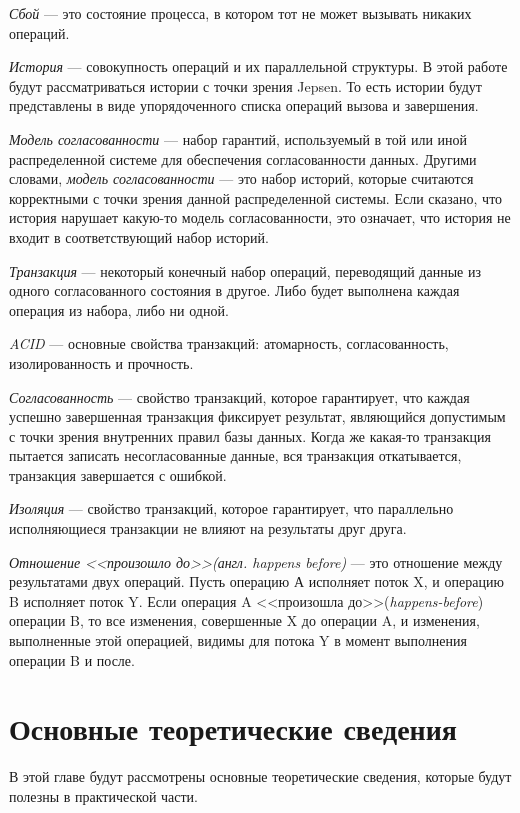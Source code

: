 \documentclass[12pt,  openany]{book}
\begin{document}
\emph{Сбой} --- это состояние процесса, в котором тот не может вызывать никаких операций. 

\emph{История} --- совокупность операций и их параллельной структуры. В этой работе будут рассматриваться истории с точки зрения Jepsen. То есть истории будут представлены в виде упорядоченного списка операций вызова и завершения.

\emph{Модель согласованности} --- набор гарантий, используемый в той или иной распределенной системе для обеспечения согласованности данных.  Другими словами,  \textit{модель согласованности} --- это набор историй, которые считаются корректными с точки зрения данной распределенной системы.  Если сказано, что история нарушает какую-то модель согласованности, это означает, что история не входит в соответствующий набор историй. \cite{jepsenConsistencyModels}

\emph{Транзакция} --- некоторый конечный набор операций, переводящий данные из одного согласованного состояния в другое. Либо будет выполнена каждая операция из набора, либо ни одной.

\emph{ACID} --- основные свойства транзакций: атомарность, согласованность, изолированность и прочность.

\emph{Согласованность} --- свойство транзакций, которое гарантирует, что каждая успешно завершенная транзакция фиксирует результат, являющийся допустимым с точки зрения внутренних правил базы данных. Когда же какая-то транзакция пытается записать несогласованные данные, вся транзакция откатывается, транзакция завершается с ошибкой.

\emph{Изоляция} --- свойство транзакций, которое гарантирует, что параллельно исполняющиеся транзакции не влияют на результаты друг друга. 

\emph{Отношение <<произошло до>>(англ. \textit{happens before})} --- \cite{habrMemoryModel} это отношение между результатами двух операций.  Пусть операцию А исполняет поток X, и операцию B исполняет поток Y. Если операция A <<произошла до>>(\textit{happens-before}) операции B, то все изменения, совершенные X до операции A, и изменения, выполненные этой операцией, видимы для потока Y в момент выполнения операции B и после.  

\chapter{Основные теоретические сведения}
В этой главе будут рассмотрены основные теоретические сведения, которые будут полезны в практической части.
\end{document}
